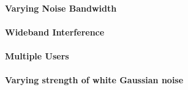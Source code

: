 	
	\paragraph{Varying Noise Bandwidth}	
	
	\paragraph{Wideband Interference}
	
	\paragraph{Multiple Users}	
	
	\paragraph{Varying strength of white Gaussian noise}
	
	
	
	